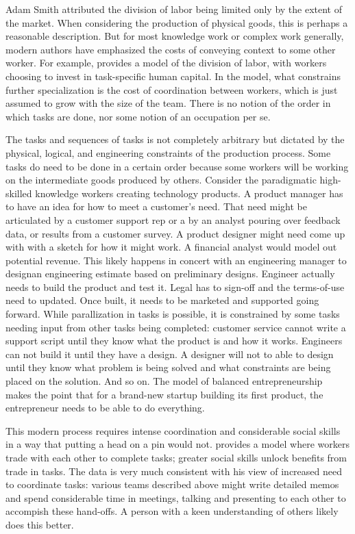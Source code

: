 \documentclass{article}
\begin{document}
Adam Smith attributed the division of labor being limited only by the extent of the market. 
When considering the production of physical goods, this is perhaps a reasonable description. 
But for most knowledge work or complex work generally, modern authors have emphasized the costs of conveying context to some other worker.
For example, \cite{becker1992division} provides a model of the division of labor, with workers choosing to invest in task-specific human capital.
In the model, what constrains further specialization is the cost of coordination between workers, which is just assumed to grow with the size of the team.
There is no notion of the order in which tasks are done, nor some notion of an occupation per se. 

The tasks and sequences of tasks is not completely arbitrary but dictated by the physical, logical, and engineering constraints of the production process.
Some tasks do need to be done in a certain order because some workers will be working on the intermediate goods produced by others.  
Consider the paradigmatic high-skilled knowledge workers creating technology products.
A product manager has to have an idea for how to meet a customer's need. 
That need might be articulated by a customer support rep or a by an analyst pouring over feedback data, or results from a customer survey.
A product designer might need come up with with a sketch for how it might work. 
A financial analyst would model out potential revenue. 
This likely happens in concert with an engineering manager to designan engineering estimate based on preliminary designs. 
Engineer actually needs to build the product and test it.  
Legal has to sign-off and the terms-of-use need to updated.
Once built, it needs to be marketed and supported going forward.
While parallization in tasks is possible, it is constrained by some tasks needing input from other tasks being completed: customer service cannot write a support script until they know what the product is and how it works. 
Engineers can not build it until they have a design.
A designer will not to able to design until they know what problem is being solved and what constraints are being placed on the solution.
And so on.
The \cite{lazear2004balanced} model of balanced entrepreneurship makes the point that for a brand-new startup building its first product, the entrepreneur needs to be able to do everything. 

This modern process requires intense coordination and considerable social skills in a way that putting a head on a pin would not. 
\cite{deming2017growing} provides a model where workers trade with each other to complete tasks; greater social skills unlock benefits from trade in tasks.
The data is very much consistent with his view of increased need to coordinate tasks:
various teams described above might write detailed memos and spend considerable time in meetings, talking and presenting to each other to accompish these hand-offs.
A person with a keen understanding of others likely does this better. 
\end{document}
